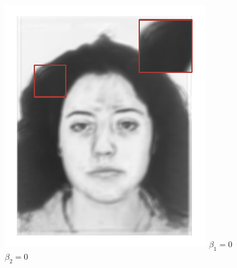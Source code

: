 \documentclass[10pt,twocolumn,letterpaper]{article}
\begin{document}
\begin{figure}[htbp]
\centering
\begin{minipage}[t]{0.16\linewidth}
\centering
\includegraphics[width=0.99\linewidth]{img/effective_eval/inf_alpha.pdf}
$\beta_1  = 0 $\\
$\beta_2  = 0 $
\end{minipage}
\begin{minipage}[t]{0.16\linewidth}
\centering

\end{minipage}
\end{figure}
\end{document}
